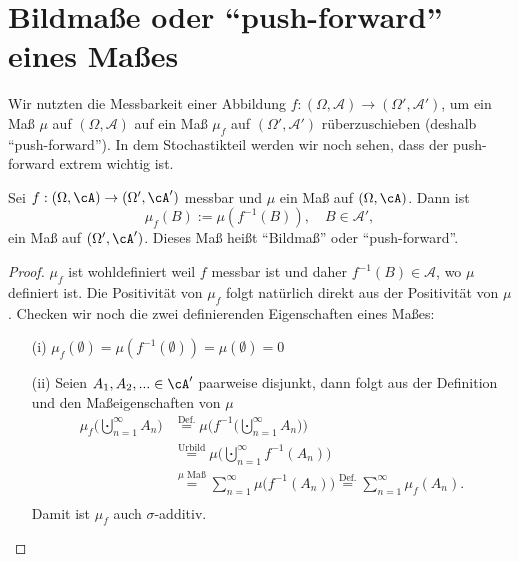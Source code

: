 \section{Bildmaße oder \enquote{push-forward} eines Maßes}

Wir nutzten die Messbarkeit einer Abbildung $f:(\Omega, \mathcal A)\to (\Omega', \mathcal A')$, um ein Ma\ss{} $\mu$ auf $(\Omega, \mathcal A)$ auf ein Ma\ss{} $\mu_f$ auf $(\Omega', \mathcal A')$ r\"uberzuschieben (deshalb \enquote{push-forward}). In dem Stochastikteil werden wir noch sehen, dass der push-forward extrem wichtig ist.

\begin{satz}\label{pushf}
	Sei $f:(\Omega, \cA) \rightarrow (\Omega', \cA')$ messbar und $\mu$ ein Maß auf $(\Omega, \cA)$. Dann ist 
	\[ \mu_f(B) := \mu\left(f^{-1}(B)\right),\quad B\in \mathcal A', \] ein Maß auf $(\Omega', \cA')$. Dieses Maß heißt \enquote{Bildmaß} oder \enquote{push-forward}.
\end{satz}

\begin{proof}
	$\mu_f$ ist wohldefiniert weil $f$ messbar ist und daher $f^{-1}(B)\in \mathcal A$, wo $\mu$ definiert ist. Die Positivit\"at von $\mu_f$ folgt nat\"urlich direkt aus der Positivit\"at von $\mu$. Checken wir noch die zwei definierenden Eigenschaften eines Ma\ss es:
	\begin{itemize}
		\item[(i)] $\mu_f ( \emptyset) = \mu\left(f^{-1}(\emptyset)\right) = \mu(\emptyset) = 0$
		\item[(ii)] Seien $A_1,A_2,... \in \cA'$ paarweise disjunkt, dann folgt aus der Definition und den Ma\ss eigenschaften von $\mu$
		\begin{align*}
			\mu_f\Big(\bigcupdot_{n=1}^{\infty}A_n\Big)&\overset{\text{Def.}}{=} \mu\Big(f^{-1}\Big(\bigcupdot_{n=1}^{\infty}A_n\Big)\Big)\\
			& \overset{\text{Urbild}}{=} \mu\Big(\bigcupdot_{n=1}^{\infty}f^{-1}(A_n)\Big)\\
			&\overset{\mu\text{ Ma\ss}}{=} \sum\limits_{n=1}^{\infty} \mu\Big( f^{-1}(A_n)\Big) \overset{\text{Def.}}{=} \sum\limits_{n=1}^{\infty} \mu_f(A_n).\\
		\end{align*}
		Damit ist $\mu_f$ auch $\sigma$-additiv.
	\end{itemize}
\end{proof}

